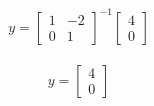 \documentclass[journal,12pt,twocolumn]{IEEEtran}
\begin{document}
\begin{align}
    y =  \begin{bmatrix}
1 & -2\\0 & 1 
\end{bmatrix}^{-1}\begin{bmatrix} 4\\
0
\end{bmatrix}
\end{align}

\begin{align}
    y = 
\begin{bmatrix} 4\\
0
\end{bmatrix}
\end{align}








\end{document}
